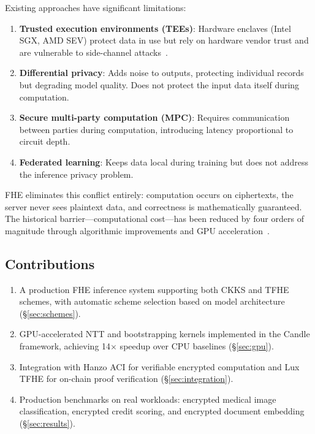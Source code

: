 \documentclass[11pt]{article}
\begin{document}
Existing approaches have significant limitations:
\begin{enumerate}[leftmargin=1.4em]
    \item \textbf{Trusted execution environments (TEEs)}: Hardware enclaves
    (Intel SGX, AMD SEV) protect data in use but rely on hardware vendor trust
    and are vulnerable to side-channel attacks~\cite{sgxattacks}.
    \item \textbf{Differential privacy}: Adds noise to outputs, protecting
    individual records but degrading model quality. Does not protect the input
    data itself during computation.
    \item \textbf{Secure multi-party computation (MPC)}: Requires communication
    between parties during computation, introducing latency proportional to
    circuit depth.
    \item \textbf{Federated learning}: Keeps data local during training but
    does not address the inference privacy problem.
\end{enumerate}

FHE eliminates this conflict entirely: computation occurs on ciphertexts, the
server never sees plaintext data, and correctness is mathematically guaranteed.
The historical barrier---computational cost---has been reduced by four orders
of magnitude through algorithmic improvements and GPU
acceleration~\cite{fhesurvey2024}.

\subsection{Contributions}

\begin{enumerate}[leftmargin=1.4em]
    \item A production FHE inference system supporting both CKKS and TFHE
    schemes, with automatic scheme selection based on model architecture
    (\S\ref{sec:schemes}).
    \item GPU-accelerated NTT and bootstrapping kernels implemented in the
    Candle framework, achieving 14$\times$ speedup over CPU baselines
    (\S\ref{sec:gpu}).
    \item Integration with Hanzo ACI for verifiable encrypted computation and
    Lux TFHE for on-chain proof verification (\S\ref{sec:integration}).
    \item Production benchmarks on real workloads: encrypted medical image
    classification, encrypted credit scoring, and encrypted document
    embedding (\S\ref{sec:results}).
\end{enumerate}
\end{document}
